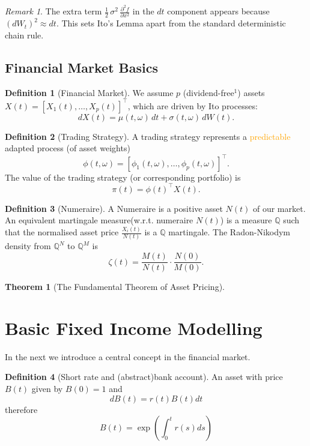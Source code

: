 \documentclass[a4paper,11pt]{book}
\newtheorem{theorem}{Theorem}[section]
\theoremstyle{definition}
\newtheorem{definition}{Definition}[section]
\theoremstyle{remark}
\newtheorem*{remark}{Remark}
\begin{document}
\begin{remark}
The extra term $\tfrac{1}{2}\,\sigma^2\,\frac{\partial^2 f}{\partial x^2}$ in the $dt$ component
appears because $(dW_t)^2 \approx dt$. This sets Ito's Lemma apart from the standard
deterministic chain rule.
\end{remark}


\subsection{Financial Market Basics}
\begin{definition}[Financial Market]
We assume \( p \) (dividend-free\(^1\)) assets \( X(t) = [X_1(t), \dots, X_p(t)]^\top \), which are driven by Ito processes:
\[
dX(t) = \mu(t, \omega)\,dt + \sigma(t, \omega)\,dW(t).
\]
\end{definition}

\begin{definition}[Trading Strategy]
A trading strategy represents a \textcolor{orange}{predictable} adapted process (of asset weights)
\[
\phi(t, \omega) = [\phi_1(t, \omega), \dots, \phi_p(t, \omega)]^\top.
\]
The value of the trading strategy (or corresponding portfolio) is
\[
\pi(t) = \phi(t)^\top X(t).
\]
\end{definition}


\begin{definition}[Numeraire]
	A Numeraire is a positive asset $N(t)$ of our market. An equivalent martingale measure(w.r.t. numeraire $N(t)$) is a measure $\mathbb{Q}$ such that the normalised asset price $\frac{X_i(t)}{N(t)}$ is a $\mathbb{Q}$ martingale.
	The Radon-Nikodym density from $\mathbb{Q}^N$ to $\mathbb{Q}^M$ is
\[
\zeta(t) = \frac{M(t)}{N(t)} \cdot \frac{N(0)}{M(0)}.
\]
	
\end{definition}

\begin{theorem}[The Fundamental Theorem of Asset Pricing]
	
\end{theorem}



\section{Basic Fixed Income Modelling}
In the next we introduce a central concept in the financial market. 
\begin{definition}[Short rate and (abstract)bank account]
	An asset with price $B(t)$ given by $B(0) = 1$ and 
	\begin{equation*}
		dB(t) = r(t)B(t)dt
	\end{equation*}
	therefore
	\begin{equation*}
		B(t) = \exp\left(\int_0^t r(s) ds\right)
	\end{equation*}
\end{definition}
\end{document}
